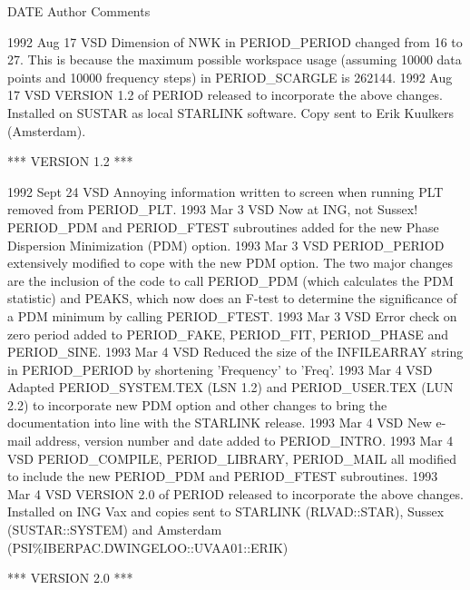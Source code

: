 \documentclass[twoside,11pt,noabs,nolof]{starlink}
\begin{document}
\newpage

\begin{small}
\begin{terminalv}
   DATE       Author            Comments

1992 Aug 17    VSD       Dimension of NWK in PERIOD_PERIOD changed from 16
                         to 27. This is because the maximum possible workspace
                         usage (assuming 10000 data points and 10000 frequency
                         steps) in PERIOD_SCARGLE is 262144.
1992 Aug 17    VSD       VERSION 1.2 of PERIOD released to incorporate the
                         above changes. Installed on SUSTAR as local
                         STARLINK software. Copy sent to Erik Kuulkers
                         (Amsterdam).

                         *** VERSION 1.2 ***

1992 Sept 24  VSD       Annoying information written to screen when running
                        PLT removed from PERIOD_PLT.
1993 Mar 3    VSD       Now at ING, not Sussex! PERIOD_PDM and PERIOD_FTEST
                        subroutines added for the new Phase Dispersion
                        Minimization (PDM) option.
1993 Mar 3    VSD       PERIOD_PERIOD extensively modified to cope with the
                        new PDM option. The two major changes are the
                        inclusion of the code to call PERIOD_PDM (which
                        calculates the PDM statistic) and PEAKS, which now
                        does an F-test to determine the significance of a
                        PDM minimum by calling PERIOD_FTEST.
1993 Mar 3    VSD       Error check on zero period added to PERIOD_FAKE,
                        PERIOD_FIT, PERIOD_PHASE and PERIOD_SINE.
1993 Mar 4    VSD       Reduced the size of the INFILEARRAY string in
                        PERIOD_PERIOD by shortening 'Frequency' to 'Freq'.
1993 Mar 4    VSD       Adapted PERIOD_SYSTEM.TEX (LSN 1.2) and
                        PERIOD_USER.TEX (LUN 2.2) to incorporate
                        new PDM option and other changes to
                        bring the documentation into line with the
                        STARLINK release.
1993 Mar 4    VSD       New e-mail address, version number and date
                        added to PERIOD_INTRO.
1993 Mar 4    VSD       PERIOD_COMPILE, PERIOD_LIBRARY, PERIOD_MAIL
                        all modified to include the new PERIOD_PDM and
                        PERIOD_FTEST subroutines.
1993 Mar 4    VSD       VERSION 2.0 of PERIOD released to incorporate
                        the above changes. Installed on ING Vax and
                        copies sent to STARLINK (RLVAD::STAR), Sussex
                        (SUSTAR::SYSTEM) and Amsterdam
                        (PSI\%IBERPAC.DWINGELOO::UVAA01::ERIK)

                         *** VERSION 2.0 ***
\end{terminalv}
\end{small}
\end{document}
